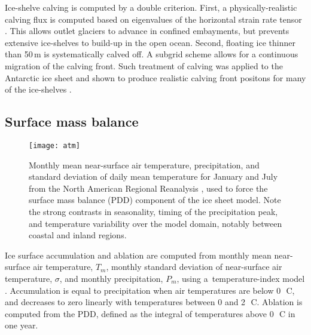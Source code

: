 \documentclass[tc]{copernicus}
\begin{document}
Ice-shelve calving is computed by a double criterion. First, a
physically-realistic calving flux is computed based on eigenvalues of the
horizontal strain rate tensor \citep{Winkelmann.etal.2011,
Levermann.etal.2012}. This allows outlet glaciers to advance in confined
embayments, but prevents extensive ice-shelves to build-up in the open ocean.
Second, floating ice thinner than 50\,m is systematically calved off. A subgrid
scheme \citep{Albrecht.etal.2011} allows for a continuous migration of the
calving front. Such treatment of calving was applied to the Antarctic ice
sheet and shown to produce realistic calving front positons for many of the
ice-shelves \citep{Martin.etal.2011}.

\subsection{Surface mass balance}
\label{sec:surface}

\begin{figure}
  \texttt{[image: atm]}
  \caption{Monthly mean near-surface air temperature, precipitation, and
           standard deviation of daily mean temperature for January and July
           from the North American Regional Reanalysis
           \citep[NARR;][]{Mesinger.etal.2006}, used to force the surface mass
           balance (PDD) component of the ice sheet model. Note the
           strong contrasts in seasonality, timing of the precipitation peak,
           and temperature variability over the model domain, notably between
           coastal and inland regions.}
  \label{fig:atm}
\end{figure}

Ice surface accumulation and ablation are computed from monthly mean
near-surface air temperature, $T_m$, monthly standard deviation of near-surface
air temperature, $\sigma$, and monthly precipitation, $P_m$, using
a~temperature-index model \citep[e.g.,][]{Hock.2003}.
Accumulation is equal to
precipitation when air temperatures are below 0\,\unit{{\degree}C}, and
decreases to zero linearly with temperatures between 0 and
2\,\unit{{\degree}C}. Ablation is computed from the PDD, defined as the
integral of temperatures above 0\,\unit{{\degree}C} in one year.
\end{document}
